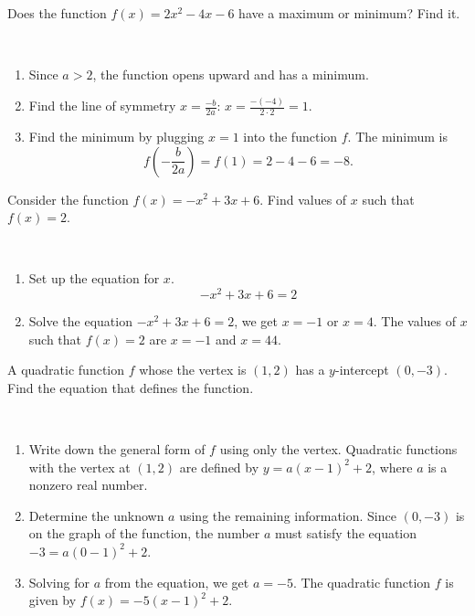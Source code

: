 \documentclass[
  en,11pt]{elegantbook}
\let\BeginKnitrBlock\begin \let\EndKnitrBlock\end
\begin{document}
\BeginKnitrBlock{example}
\protect\hypertarget{exm:unnamed-chunk-260}{}{\label{exm:unnamed-chunk-260} }
Does the function \(f(x)=2x^2-4x-6\) have a maximum or minimum? Find it.
\EndKnitrBlock{example}

\BeginKnitrBlock{solution}
{}\\

\begin{enumerate}
\def\labelenumi{\arabic{enumi}.}

\item
  Since \(a>2\), the function opens upward and has a minimum.
\item
  Find the line of symmetry \(x=\frac{-b}{2a}\):
  \(x=\frac{-(-4)}{2\cdot 2}=1\).
\item
  Find the minimum by plugging \(x=1\) into the function \(f\).
  The minimum is
  \[
   f(-\frac{b}{2a})=f(1)=2-4-6=-8.
   \]
\end{enumerate}
\EndKnitrBlock{solution}

\BeginKnitrBlock{example}
\protect\hypertarget{exm:unnamed-chunk-262}{}{\label{exm:unnamed-chunk-262} }
Consider the function \(f(x)=-x^2+3x+6\). Find values of \(x\) such that \(f(x)=2\).
\EndKnitrBlock{example}

\BeginKnitrBlock{solution}
{}\\

\begin{enumerate}
\def\labelenumi{\arabic{enumi}.}

\item
  Set up the equation for \(x\).
  \[-x^2+3x+6=2\]
\item
  Solve the equation \(-x^2+3x+6=2\), we get \(x=-1\) or \(x=4\).
  The values of \(x\) such that \(f(x)=2\) are \(x=-1\) and \(x=44\).
\end{enumerate}
\EndKnitrBlock{solution}

\BeginKnitrBlock{example}
\protect\hypertarget{exm:unnamed-chunk-264}{}{\label{exm:unnamed-chunk-264} }
A quadratic function \(f\) whose the vertex is \((1, 2)\) has a \(y\)-intercept \((0, -3)\). Find the equation that defines the function.
\EndKnitrBlock{example}

\BeginKnitrBlock{solution}
{}\\

\begin{enumerate}
\def\labelenumi{\arabic{enumi}.}

\item
  Write down the general form of \(f\) using only the vertex.
  Quadratic functions with the vertex at \((1,2)\) are defined by \(y=a(x-1)^2+2\), where \(a\) is a nonzero real number.
\item
  Determine the unknown \(a\) using the remaining information.
  Since \((0, -3)\) is on the graph of the function, the number \(a\) must satisfy the equation \(-3=a(0-1)^2+2\).
\item
  Solving for \(a\) from the equation, we get \(a=-5\).
  The quadratic function \(f\) is given by \(f(x)=-5(x-1)^2+2\).
\end{enumerate}
\EndKnitrBlock{solution}
\end{document}
